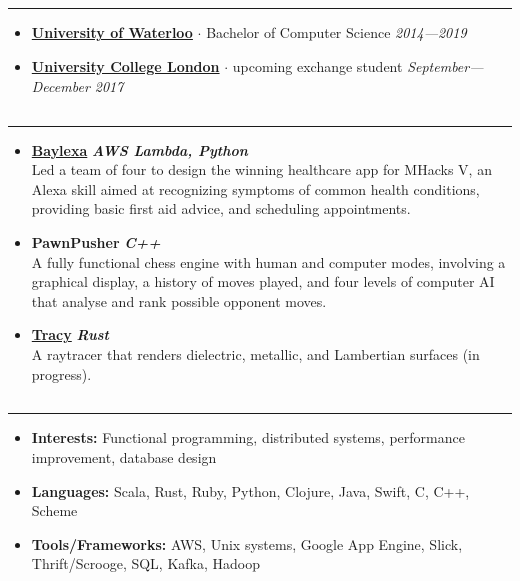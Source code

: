 \documentclass[5pt,letterpaper]{article}
\newcommand{\dt}{$\cdot$ }
\begin{document}
\subsection*{}
\hrule
\vspace{1.0em}
\begin{itemize}[leftmargin=1em, noitemsep]
  \item[]
    {\href{http://www.uwaterloo.ca}{\textbf{University of Waterloo}}} \dt
    Bachelor of Computer Science \hfill \emph{2014---2019}
  \item[]
    {\href{https://www.ucl.ac.uk/}{\textbf{University College London}}} \dt upcoming exchange student
    \hfill \emph{September---December 2017}

\end{itemize}

\subsection*{}
\hrule
\vspace{1.0em}
\begin{itemize}[leftmargin=1em, noitemsep]
  \item[]
    {\href{http://devpost.com/software/baylexa-fv149r}{\textbf{Baylexa}}}
    \hfill \textbf{\emph{AWS Lambda, Python}}
    \\
    Led a team of four to design the winning healthcare app for MHacks V, an
    Alexa skill aimed at recognizing symptoms of common health conditions,
    providing basic first aid advice, and scheduling appointments.
  \item[]
    \textbf{PawnPusher} \hfill \textbf{\emph{C++}}
    \\
    A fully functional chess engine with human and computer modes, involving a
    graphical display, a history of moves played, and four levels of computer
    AI that analyse and rank possible opponent moves.
  \item[]
    \textbf{\href{https://github.com/arshiamufti/tracy}{Tracy}} \hfill \textbf{\emph{Rust}}
    \\
    A raytracer that renders dielectric, metallic, and Lambertian surfaces (in progress).
\end{itemize}


\subsection*{}
\hrule
\vspace{1.0em}
\begin{itemize}[leftmargin=1em, noitemsep]
  \item[]
    \textbf{Interests:} Functional programming, distributed systems,
    performance improvement, database design
  \item[]
    \textbf{Languages:} Scala, Rust, Ruby, Python, Clojure, Java, Swift, C, C++, Scheme
  \item[]
    \textbf{Tools/Frameworks:} AWS, Unix systems, Google App Engine, Slick,
    Thrift/Scrooge, SQL, Kafka, Hadoop
\end{itemize}
\end{document}
